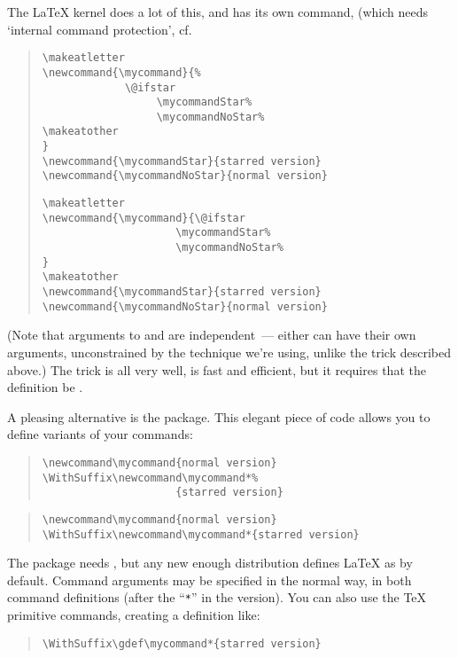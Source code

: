 The \LaTeX{} kernel does a lot of this, and has its own command,
 (which needs `internal command protection', cf.
\begin{quote}
\begin{wideversion}
\begin{verbatim}
\makeatletter
\newcommand{\mycommand}{%
             \@ifstar
                  \mycommandStar%
                  \mycommandNoStar%
\makeatother
}
\newcommand{\mycommandStar}{starred version}
\newcommand{\mycommandNoStar}{normal version}
\end{verbatim}
\end{wideversion}
\begin{narrowversion}
\begin{verbatim}
\makeatletter
\newcommand{\mycommand}{\@ifstar
                     \mycommandStar%
                     \mycommandNoStar%
}
\makeatother
\newcommand{\mycommandStar}{starred version}
\newcommand{\mycommandNoStar}{normal version}
\end{verbatim}
\end{narrowversion}
\end{quote}
(Note that arguments to  and 
are independent~--- either can have their own arguments, unconstrained
by the technique we're using, unlike the trick described above.)
The  trick is all very well, is fast and efficient, but
it requires that the definition be %
.

A pleasing alternative is the  package.  This elegant
piece of code allows you to define variants of your commands:
\begin{narrowversion}
\begin{quote}
\begin{verbatim}
\newcommand\mycommand{normal version}
\WithSuffix\newcommand\mycommand*%
                     {starred version}
\end{verbatim}
\end{quote}
\end{narrowversion}
\begin{wideversion}
\begin{quote}
\begin{verbatim}
\newcommand\mycommand{normal version}
\WithSuffix\newcommand\mycommand*{starred version}
\end{verbatim}
\end{quote}
\end{wideversion}
The package needs , but any new enough
distribution defines \LaTeX{} as \elatex{} by default.  Command
arguments may be specified in the normal way, in both command
definitions (after the ``\texttt{*}'' in the 
version).  You can also use the \TeX{} primitive commands, creating a
definition like:
\begin{quote}
\begin{verbatim}
\WithSuffix\gdef\mycommand*{starred version}
\end{verbatim}
\end{quote}

